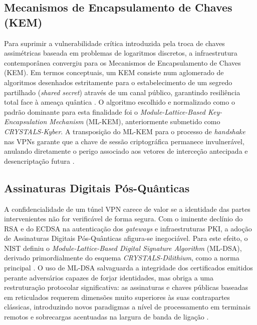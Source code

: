 \documentclass[runningheads]{llncs}
\begin{document}
\subsection{Mecanismos de Encapsulamento de Chaves (KEM)}
Para suprimir a vulnerabilidade crítica introduzida pela troca de chaves assimétricas baseada em problemas de logaritmos discretos, a infraestrutura contemporânea convergiu para os Mecanismos de Encapsulamento de Chaves (KEM). Em termos conceptuais, um KEM consiste num aglomerado de algoritmos desenhados estritamente para o estabelecimento de um segredo partilhado (\textit{shared secret}) através de um canal público, garantindo resiliência total face à ameaça quântica \cite{nist2024fips203}. O algoritmo escolhido e normalizado como o padrão dominante para esta finalidade foi o \textit{Module-Lattice-Based Key-Encapsulation Mechanism} (ML-KEM), anteriormente submetido como \textit{CRYSTALS-Kyber}. A transposição do ML-KEM para o processo de \textit{handshake} nas VPNs garante que a chave de sessão criptográfica permanece invulnerável, anulando diretamente o perigo associado aos vetores de interceção antecipada e desencriptação futura \cite{10827179,cryptoeprint:2020/379}.

\subsection{Assinaturas Digitais Pós-Quânticas}
A confidencialidade de um túnel VPN carece de valor se a identidade das partes intervenientes não for verificável de forma segura. Com o iminente declínio do RSA e do ECDSA na autenticação dos \textit{gateways} e infraestruturas PKI, a adoção de Assinaturas Digitais Pós-Quânticas afigura-se inegociável. Para este efeito, o NIST definiu o \textit{Module-Lattice-Based Digital Signature Algorithm} (ML-DSA), derivado primordialmente do esquema \textit{CRYSTALS-Dilithium}, como a norma principal \cite{cryptoeprint:2020/071}. O uso de ML-DSA salvaguarda a integridade dos certificados emitidos perante adversários capazes de forjar identidades, mas obriga a uma restruturação protocolar significativa: as assinaturas e chaves públicas baseadas em reticulados requerem dimensões muito superiores às suas contrapartes clássicas, introduzindo novos paradigmas a nível de processamento em terminais remotos e sobrecargas acentuadas na largura de banda de ligação \cite{cryptoeprint:2020/071}.
\end{document}
